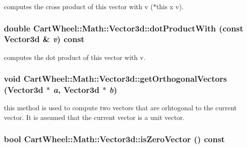 \label{classCartWheel_1_1Math_1_1Vector3d_a00283de03507da30bf2a9e8ce84b22bd}
computes the cross product of this vector with v ($\ast$this x v). \hypertarget{classCartWheel_1_1Math_1_1Vector3d_a1125939f0844bb820b4e9ca9abd744ef}{
\subsubsection[{dotProductWith}]{\setlength{\rightskip}{0pt plus 5cm}double CartWheel::Math::Vector3d::dotProductWith (const {\bf Vector3d} \& {\em v}) const}}
\label{classCartWheel_1_1Math_1_1Vector3d_a1125939f0844bb820b4e9ca9abd744ef}
computes the dot product of this vector with v. \hypertarget{classCartWheel_1_1Math_1_1Vector3d_a9c2953954890c8031427943f7aef39ab}{
\subsubsection[{getOrthogonalVectors}]{\setlength{\rightskip}{0pt plus 5cm}void CartWheel::Math::Vector3d::getOrthogonalVectors ({\bf Vector3d} $\ast$ {\em a}, \/  {\bf Vector3d} $\ast$ {\em b})}}
\label{classCartWheel_1_1Math_1_1Vector3d_a9c2953954890c8031427943f7aef39ab}
this method is used to compute two vectors that are orhtogonal to the current vector. It is assumed that the current vector is a unit vector. \hypertarget{classCartWheel_1_1Math_1_1Vector3d_aeba6f76ad4966a70d49ec9d56bd01f09}{
\subsubsection[{isZeroVector}]{\setlength{\rightskip}{0pt plus 5cm}bool CartWheel::Math::Vector3d::isZeroVector () const}}
\label{classCartWheel_1_1Math_1_1Vector3d_aeba6f76ad4966a70d49ec9d56bd01f09}
